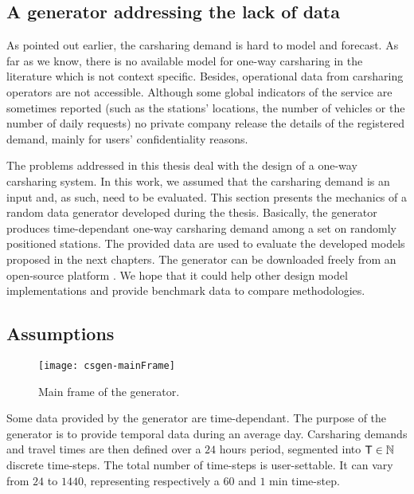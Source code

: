 \begin{bibunit}[ieeetr]
\newpage
\section{A generator addressing the lack of data}

As pointed out earlier, the carsharing demand is hard to model and forecast.
As far as we know, there is no available model for one-way carsharing in the literature which is not context specific.
Besides, operational data from carsharing operators are not accessible.
Although some global indicators of the service are sometimes reported (such as the stations' locations, the number of vehicles or the number of daily requests) no private company release the details of the registered demand, mainly for users' confidentiality reasons.

\medskip
The problems addressed in this thesis deal with the design of a one-way carsharing system.
In this work, we assumed that the carsharing demand is an input and, as such, need to be evaluated.
This section presents the mechanics of a random data generator developed during the thesis.
Basically, the generator produces time-dependant one-way carsharing demand among a set on randomly positioned stations.
The provided data are used to evaluate the developed models proposed in the next chapters.
The generator can be downloaded freely from an open-source platform \cite{csgen}.
We hope that it could help other design model implementations and provide benchmark data to compare methodologies.


\subsection{Assumptions}

\begin{figure}[!h]
\centering
\texttt{[image: csgen-mainFrame]}
\caption{Main frame of the generator.}
\label{fig_randomStationPositioning}
\end{figure}

Some data provided by the generator are time-dependant.
The purpose of the generator is to provide temporal data during an average day.
Carsharing demands and travel times are then defined over a $24$ hours period, segmented into $\mathsf{T} \in \mathbb{N}$ discrete time-steps.
The total number of time-steps is user-settable.
It can vary from $24$ to $1440$, representing respectively a $60$ and $1$ min time-step.


\end{bibunit}
